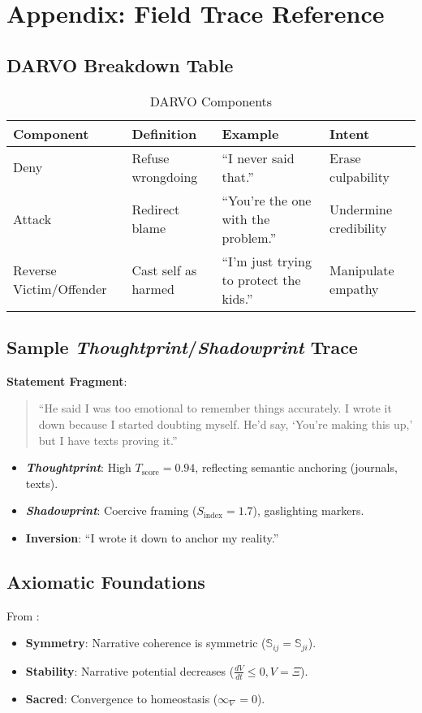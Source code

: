 \documentclass[11pt]{article}
\newcommand{\thoughtprint}{\textit{Thoughtprint}}
\newcommand{\shadowprint}{\textit{Shadowprint}}
\begin{document}
\section{Appendix: Field Trace Reference}
\label{sec:appendix}
\subsection{DARVO Breakdown Table}
\begin{table}[htbp]
\small
\centering
\caption{DARVO Components}
\begin{tabular}{p{2.5cm}p{4cm}p{4cm}p{3cm}}
\toprule
\textbf{Component} & \textbf{Definition} & \textbf{Example} & \textbf{Intent} \\
\midrule
Deny & Refuse wrongdoing & ``I never said that.'' & Erase culpability \\
Attack & Redirect blame & ``You’re the one with the problem.'' & Undermine credibility \\
Reverse Victim/Offender & Cast self as harmed & ``I’m just trying to protect the kids.'' & Manipulate empathy \\
\bottomrule
\end{tabular}
\label{tab:darvo}
\end{table}

\subsection{Sample \thoughtprint{}/\shadowprint{} Trace}
\textbf{Statement Fragment}:  
\begin{quote}
``He said I was too emotional to remember things accurately. I wrote it down because I started doubting myself. He’d say, `You’re making this up,' but I have texts proving it.''
\end{quote}
\begin{itemize}
    \item \textbf{\thoughtprint{}}: High \(T_{\text{score}} = 0.94\), reflecting semantic anchoring (journals, texts).
    \item \textbf{\shadowprint{}}: Coercive framing (\(S_{\text{index}} = 1.7\)), gaslighting markers.
    \item \textbf{Inversion}: ``I wrote it down to anchor my reality.''
\end{itemize}

\subsection{Axiomatic Foundations}
From \cite{havens2025a}:
\begin{itemize}
    \item \textbf{Symmetry}: Narrative coherence is symmetric (\(\mathbb{S}_{ij} = \mathbb{S}_{ji}\)).
    \item \textbf{Stability}: Narrative potential decreases (\(\frac{dV}{dt} \leq 0, V = \Xi\)).
    \item \textbf{Sacred}: Convergence to homeostasis (\(\infty_\nabla = 0\)).
\end{itemize}
\end{document}
